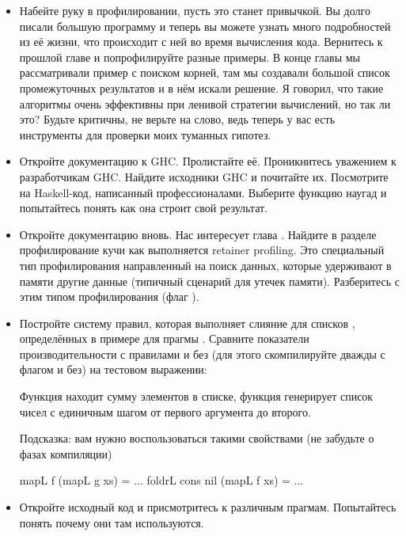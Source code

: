 \begin{itemize}
\item Набейте руку в профилировании, пусть это станет привычкой.
Вы долго писали большую программу и теперь вы можете
узнать много подробностей из её жизни, что происходит с ней
во время вычисления кода. Вернитесь к прошлой главе и 
попрофилируйте разные примеры. В конце главы мы рассматривали
пример с поиском корней, там мы создавали большой список
промежуточных результатов и в нём искали решение.
Я говорил, что такие алгоритмы очень эффективны при 
ленивой стратегии вычислений, но так ли это? Будьте
критичны, не верьте на слово, ведь теперь у вас есть 
инструменты для проверки моих туманных гипотез.

\item Откройте документацию к GHC. Пролистайте её. 
Проникнитесь уважением к разработчикам GHC. 
Найдите исходники GHC и почитайте их. Посмотрите на Haskell-код,
написанный профессионалами. Выберите функцию
наугад и попытайтесь понять как она строит свой результат.


\item Откройте документацию вновь. Нас интересует
глава . Найдите в разделе профилирование
кучи как выполняется retainer profiling. Это специальный
тип профилирования направленный на поиск данных, которые
удерживают в памяти другие данные (типичный сценарий для
утечек памяти). Разберитесь с этим типом профилирования 
(флаг ).

\item Постройте систему правил, которая выполняет 
слияние для списков  , определённых в примере
для прагмы . Сравните показатели производительности
с правилами и без (для этого скомпилируйте дважды с флагом  и без) 
на тестовом выражении:


Функция  находит сумму элементов в списке, 
функция  генерирует список чисел с единичным
шагом от первого аргумента до второго. 

Подсказка: вам нужно воспользоваться такими свойствами
(не забудьте о фазах компиляции)

\begin{code}
mapL f (mapL g xs)              = ...
foldrL cons nil (mapL f xs)     = ...     
\end{code}

\item Откройте исходный код  и присмотритесь
к различным прагмам. Попытайтесь понять почему они там 
используются.

\end{itemize}

